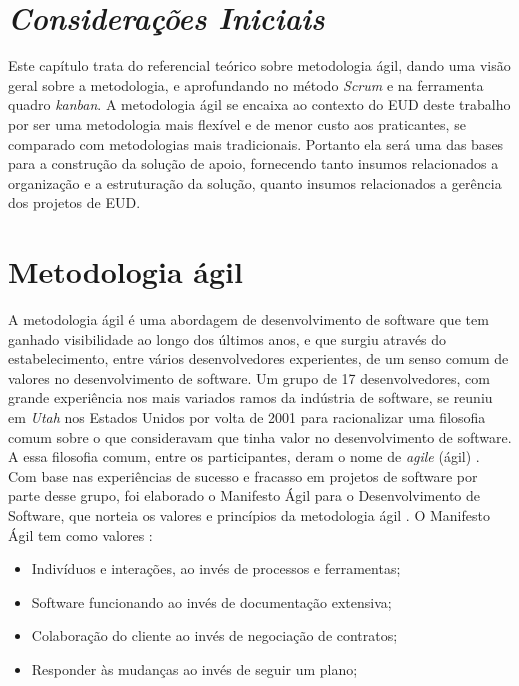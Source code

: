 \section{\textit{Considerações Iniciais}}

Este capítulo trata do referencial teórico sobre metodologia ágil, dando uma visão geral sobre a metodologia, e aprofundando no método \textit{Scrum} e na ferramenta quadro \textit{kanban}. A metodologia ágil se encaixa ao contexto do EUD deste trabalho por ser uma metodologia mais flexível e de menor custo aos praticantes, se comparado com metodologias mais tradicionais. Portanto ela será uma das bases para a construção da solução de apoio, fornecendo tanto insumos relacionados a organização e a estruturação da solução, quanto insumos relacionados a gerência dos projetos de EUD.

\section{Metodologia ágil}

A metodologia ágil é uma abordagem de desenvolvimento de software que tem ganhado visibilidade ao longo dos últimos anos, e que surgiu através do estabelecimento, entre vários desenvolvedores experientes, de um senso comum de valores no desenvolvimento de software. Um grupo de 17 desenvolvedores, com grande experiência nos mais variados ramos da indústria de software, se reuniu em \textit{Utah} nos Estados Unidos por volta de 2001 para racionalizar uma filosofia comum sobre o que consideravam que tinha valor no desenvolvimento de software. A essa filosofia comum, entre os participantes, deram o nome de \textit{agile} (ágil) \cite{metodoAgil}. Com base nas experiências de sucesso e fracasso em projetos de software por parte desse grupo, foi elaborado o Manifesto Ágil para o Desenvolvimento de Software, que norteia os valores e princípios da metodologia ágil \cite{metodoAgil}. O Manifesto Ágil tem como valores \cite{metodoAgil}:

\begin{itemize}
\item Indivíduos e interações, ao invés de processos e ferramentas;
\item Software funcionando ao invés de documentação extensiva;
\item Colaboração do cliente ao invés de negociação de contratos;
\item Responder às mudanças ao invés de seguir um plano;
\end{itemize}

